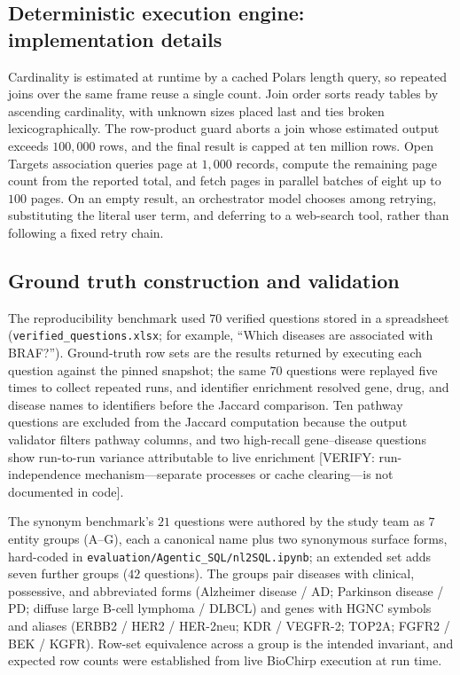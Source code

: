 \subsection*{Deterministic execution engine: implementation details}

Cardinality is estimated at runtime by a cached Polars length query, so repeated joins over the same frame reuse a single count. Join order sorts ready tables by ascending cardinality, with unknown sizes placed last and ties broken lexicographically. The row-product guard aborts a join whose estimated output exceeds $100{,}000$ rows, and the final result is capped at ten million rows. Open Targets association queries page at $1{,}000$ records, compute the remaining page count from the reported total, and fetch pages in parallel batches of eight up to $100$ pages. On an empty result, an orchestrator model chooses among retrying, substituting the literal user term, and deferring to a web-search tool, rather than following a fixed retry chain.

\subsection*{Ground truth construction and validation}

The reproducibility benchmark used $70$ verified questions stored in a spreadsheet (\texttt{verified\_questions.xlsx}; for example, ``Which diseases are associated with BRAF?''). Ground-truth row sets are the results returned by executing each question against the pinned snapshot; the same $70$ questions were replayed five times to collect repeated runs, and identifier enrichment resolved gene, drug, and disease names to identifiers before the Jaccard comparison. Ten pathway questions are excluded from the Jaccard computation because the output validator filters pathway columns, and two high-recall gene--disease questions show run-to-run variance attributable to live enrichment [VERIFY: run-independence mechanism---separate processes or cache clearing---is not documented in code].

The synonym benchmark's $21$ questions were authored by the study team as $7$ entity groups (A--G), each a canonical name plus two synonymous surface forms, hard-coded in \texttt{evaluation/Agentic\_SQL/nl2SQL.ipynb}; an extended set adds seven further groups ($42$ questions). The groups pair diseases with clinical, possessive, and abbreviated forms (Alzheimer disease / AD; Parkinson disease / PD; diffuse large B-cell lymphoma / DLBCL) and genes with HGNC symbols and aliases (ERBB2 / HER2 / HER-2neu; KDR / VEGFR-2; TOP2A; FGFR2 / BEK / KGFR). Row-set equivalence across a group is the intended invariant, and expected row counts were established from live BioChirp execution at run time.

